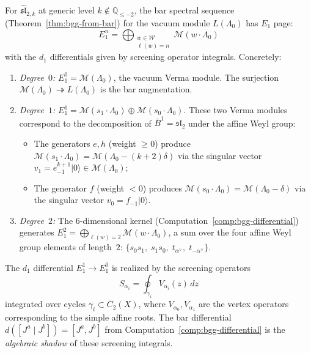 \begin{theorem}
\label{thm:bgg-sl2-bar-explicit}

For $\widehat{\mathfrak{sl}}_{2,k}$ at generic level $k \notin \mathbb{Q}_{\leq -2}$,
the bar spectral sequence
\textup{(}Theorem~\textup{\ref{thm:bgg-from-bar})} for the vacuum
module $L(\Lambda_0)$ has $E_1$ page:
\begin{equation}\label{eq:bgg-E1}
E_1^n = \bigoplus_{\substack{w \in \mathcal{W} \\ \ell(w) = n}}
\mathcal{M}(w \cdot \Lambda_0)
\end{equation}
with the $d_1$ differentials given by screening operator integrals.
Concretely:
\begin{enumerate}[label=\textup{(\roman*)}]
\item \emph{Degree~$0$:} $E_1^0 = \mathcal{M}(\Lambda_0)$, the vacuum
  Verma module.  The surjection $\mathcal{M}(\Lambda_0) \twoheadrightarrow
  L(\Lambda_0)$ is the bar augmentation.

\item \emph{Degree~$1$:} $E_1^1 = \mathcal{M}(s_1 \cdot \Lambda_0)
  \oplus \mathcal{M}(s_0 \cdot \Lambda_0)$.  These two Verma modules
  correspond to the decomposition of $\bar{B}^1 = \mathfrak{sl}_2$
  under the affine Weyl group:
  \begin{itemize}
  \item The generators $e, h$ (weight $\geq 0$) produce
    $\mathcal{M}(s_1 \cdot \Lambda_0) = \mathcal{M}(\Lambda_0 -
    (k{+}2)\delta)$
    via the singular vector
    $v_1 = e_{-1}^{k+1} \lvert 0 \rangle \in \mathcal{M}(\Lambda_0)$;
  \item The generator $f$ (weight $< 0$) produces
    $\mathcal{M}(s_0 \cdot \Lambda_0) = \mathcal{M}(\Lambda_0 - \delta)$
    via the singular vector $v_0 = f_{-1}\lvert 0 \rangle$.
  \end{itemize}

\item \emph{Degree~$2$:} The $6$-dimensional kernel
  \textup{(}Computation~\textup{\ref{comp:bgg-differential})} generates
  $E_1^2 = \bigoplus_{\ell(w)=2} \mathcal{M}(w \cdot \Lambda_0)$, a sum
  over the four affine Weyl group elements of length~$2$:
  $\{s_0 s_1,\; s_1 s_0,\; t_{\alpha^\vee},\; t_{-\alpha^\vee}\}$.
\end{enumerate}

The $d_1$ differential $E_1^1 \to E_1^0$ is realized by the screening
operators
\begin{equation}\label{eq:screening-sl2}
S_{\alpha_i} = \oint_{\gamma_i} V_{\alpha_i}(z)\, dz
\end{equation}
integrated over cycles $\gamma_i \subset \overline{C}_2(X)$, where
$V_{\alpha_0}, V_{\alpha_1}$ are the vertex operators corresponding
to the simple affine roots.  The bar differential
$d([J^a \mid J^b]) = [J^a, J^b]$ from
Computation~\textup{\ref{comp:bgg-differential}} is the \emph{algebraic
shadow} of these screening integrals.
\end{theorem}

